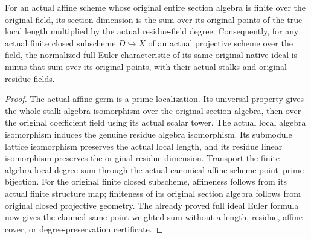 \begin{theorem}
\label{thm:fc-affine-scheme-local-degrees}
\leanok
{}
For an actual affine scheme whose original entire section algebra is finite
over the original field, its section dimension is the sum over its original
points of the true local length multiplied by the actual residue-field degree.
Consequently, for any actual finite closed subscheme $D\hookrightarrow X$ of
an actual projective scheme over the field, the normalized full Euler
characteristic of its same original native ideal is minus that sum over
its original points, with their actual stalks and original residue fields.
\end{theorem}
\begin{proof}
The actual affine germ is a prime localization. Its universal property gives
the whole stalk algebra isomorphism over the original section algebra, then
over the original coefficient field using its actual scalar tower.
The actual local algebra isomorphism induces the genuine residue algebra
isomorphism. Its submodule lattice isomorphism preserves the actual local
length, and its residue linear isomorphism preserves the original residue
dimension. Transport the finite-algebra local-degree sum through the actual
canonical affine scheme point--prime bijection. For the original finite
closed subscheme, affineness follows from its actual finite structure map;
finiteness of its original section algebra follows from original closed
projective geometry. The already proved full ideal Euler formula now gives
the claimed same-point weighted sum without a length, residue, affine-cover,
or degree-preservation certificate.
\end{proof}
